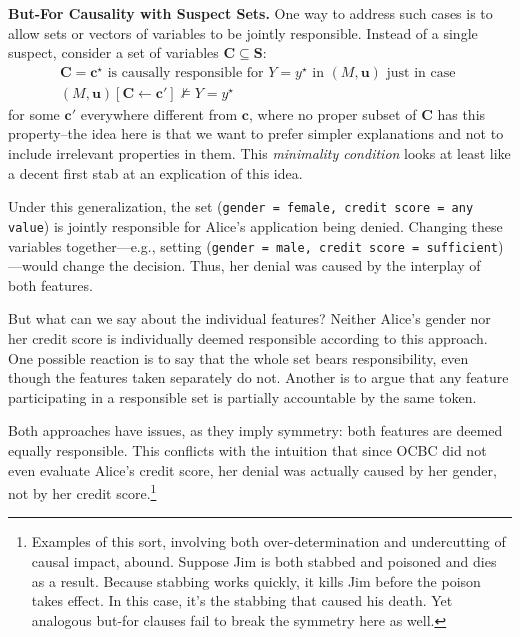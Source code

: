 \documentclass[twoside,11pt]{article}
\renewcommand{\texttt}[1]{\lstinline[basicstyle=\fontsize{8pt}{8.25pt}\selectfont\ttfamily]{#1}}
\begin{document}
\vspace{2mm}
\noindent \textbf{But-For Causality with  Suspect Sets.} One way to address such cases is to allow sets or vectors of variables to be jointly responsible. Instead of a single suspect, consider a set of variables $\mathbf{C}\subseteq \mathbf{S}$:
\begin{align*}
\mathbf{C} = \mathbf{c}^\star \text{ is causally responsible for } Y = y^\star \text{ in } (M, \mathbf{u}) \text{ just in case } \\  (M, \mathbf{u})[\mathbf{C} \leftarrow \mathbf{c'}] \not \models Y= y ^\star
\end{align*}
for some $\mathbf{c'}$ everywhere different from $\mathbf{c}$, where no proper subset of $\mathbf{C}$ has this property--the idea here is that we want to prefer simpler explanations and not to include irrelevant properties in them. This \emph{minimality condition} looks at least like a decent first stab at an explication of this idea.


Under this generalization, the set (\texttt{gender = female, credit score = any value}) is jointly responsible for Alice's application being denied. Changing these variables together---e.g., setting (\texttt{gender = male, credit score = sufficient})---would change the decision. Thus, her denial was caused by the interplay of both features.

But what can we say about the individual features? Neither Alice’s gender nor her credit score is individually deemed responsible according to this approach. One possible reaction is to say that the whole set bears responsibility, even though the features taken separately do not. Another is to argue that any feature participating in a responsible set is partially accountable by the same token.  

Both approaches have issues, as they imply symmetry: both features are deemed equally responsible. This conflicts with the intuition that since OCBC did not even evaluate Alice’s credit score, her denial was actually caused by her gender, not by her credit score.\footnote{Examples of this sort, involving both over-determination and undercutting of causal impact, abound. Suppose Jim is both stabbed and poisoned and dies as a result. Because stabbing works quickly, it kills Jim before the poison takes effect. In this case, it’s the stabbing that caused his death. Yet analogous but-for clauses fail to break the symmetry here as well.}

\vspace{2mm}
\end{document}
